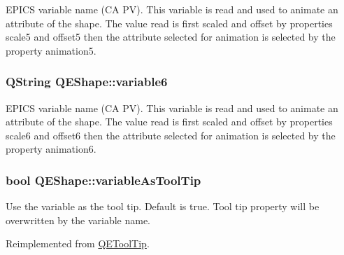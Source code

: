 \label{classQEShape_a63e072e89a4f7f09f074a786d02a02f3}
EPICS variable name (CA PV). This variable is read and used to animate an attribute of the shape. The value read is first scaled and offset by properties scale5 and offset5 then the attribute selected for animation is selected by the property animation5. \hypertarget{classQEShape_a04779df1e2810595e1b5af2618b31b86}{
\subsubsection[{variable6}]{\setlength{\rightskip}{0pt plus 5cm}QString QEShape::variable6}}
\label{classQEShape_a04779df1e2810595e1b5af2618b31b86}
EPICS variable name (CA PV). This variable is read and used to animate an attribute of the shape. The value read is first scaled and offset by properties scale6 and offset6 then the attribute selected for animation is selected by the property animation6. \hypertarget{classQEShape_ab53a66fe65ec64ca6aee6fe11b3a4dc0}{
\subsubsection[{variableAsToolTip}]{\setlength{\rightskip}{0pt plus 5cm}bool QEShape::variableAsToolTip}}
\label{classQEShape_ab53a66fe65ec64ca6aee6fe11b3a4dc0}
Use the variable as the tool tip. Default is true. Tool tip property will be overwritten by the variable name. 

Reimplemented from \hyperlink{classQEToolTip}{QEToolTip}.

